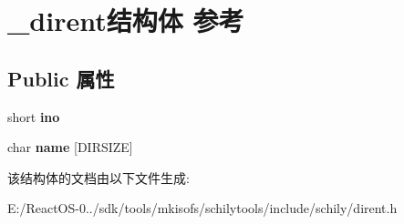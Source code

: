 \hypertarget{struct__dirent}{}\section{\+\_\+dirent结构体 参考}
\label{struct__dirent}
\subsection*{Public 属性}
\begin{DoxyCompactItemize}
\item 
\mbox{\label{struct__dirent_a1255bfaca9cf7d9c8792c084c338f310}} 
short {\bfseries ino}
\item 
\mbox{\label{struct__dirent_a14f53fdfb216c7fc22f9370f71818e88}} 
char {\bfseries name} \mbox{[}D\+I\+R\+S\+I\+ZE\mbox{]}
\end{DoxyCompactItemize}


该结构体的文档由以下文件生成\+:\begin{DoxyCompactItemize}
\item 
E\+:/\+React\+O\+S-\/0../sdk/tools/mkisofs/schilytools/include/schily/dirent.\+h\end{DoxyCompactItemize}
